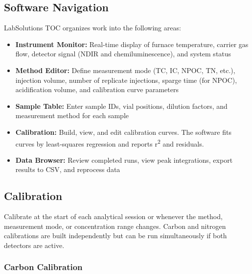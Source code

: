 \documentclass[
  11pt,
  letterpaper,
]{article}
\providecommand{\tightlist}{%
  \setlength{\itemsep}{0pt}\setlength{\parskip}{0pt}}
\begin{document}
\subsection{Software Navigation}\label{software-navigation}

LabSolutions TOC organizes work into the following areas:

\begin{itemize}
\tightlist
\item
  \textbf{Instrument Monitor:} Real-time display of furnace temperature,
  carrier gas flow, detector signal (NDIR and chemiluminescence), and
  system status
\item
  \textbf{Method Editor:} Define measurement mode (TC, IC, NPOC, TN,
  etc.), injection volume, number of replicate injections, sparge time
  (for NPOC), acidification volume, and calibration curve parameters
\item
  \textbf{Sample Table:} Enter sample IDs, vial positions, dilution
  factors, and measurement method for each sample
\item
  \textbf{Calibration:} Build, view, and edit calibration curves. The
  software fits curves by least-squares regression and reports
  r\textsuperscript{2} and residuals.
\item
  \textbf{Data Browser:} Review completed runs, view peak integrations,
  export results to CSV, and reprocess data
\end{itemize}

\subsection{Calibration}\label{calibration}

Calibrate at the start of each analytical session or whenever the
method, measurement mode, or concentration range changes. Carbon and
nitrogen calibrations are built independently but can be run
simultaneously if both detectors are active.

\subsubsection{Carbon Calibration}\label{carbon-calibration}
\end{document}
